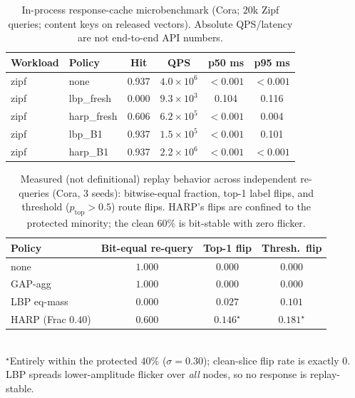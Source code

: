 \documentclass[conference]{IEEEtran}
\begin{document}
\begin{table}[!t]
\caption{In-process response-cache microbenchmark (Cora; $20$k Zipf queries; content keys on released vectors). Absolute QPS/latency are not end-to-end API numbers.}
\label{tab:serving}
\centering
\scriptsize
\begin{tabular}{@{}llcccc@{}}
\toprule
\textbf{Workload} & \textbf{Policy} & \textbf{Hit} & \textbf{QPS} & \textbf{p50 ms} & \textbf{p95 ms} \\
\midrule
zipf & none & 0.937 & $4.0{\times}10^6$ & ${<}0.001$ & ${<}0.001$ \\
zipf & lbp\_fresh & 0.000 & $9.3{\times}10^3$ & 0.104 & 0.116 \\
zipf & harp\_fresh & 0.606 & $6.2{\times}10^5$ & ${<}0.001$ & 0.004 \\
zipf & lbp\_B1 & 0.937 & $1.5{\times}10^5$ & ${<}0.001$ & 0.101 \\
zipf & harp\_B1 & 0.937 & $2.2{\times}10^6$ & ${<}0.001$ & ${<}0.001$ \\
\bottomrule
\end{tabular}
\end{table}

\begin{table}[!t]
\caption{Measured (not definitional) replay behavior across independent re-queries (Cora, 3 seeds): bitwise-equal fraction, top-1 label flips, and threshold ($p_{\mathrm{top}}{>}0.5$) route flips. HARP's flips are confined to the protected minority; the clean $60\%$ is bit-stable with zero flicker.}
\label{tab:cache}
\centering
\scriptsize
\begin{tabular}{@{}lccc@{}}
\toprule
\textbf{Policy} & \textbf{Bit-equal re-query} & \textbf{Top-1 flip} & \textbf{Thresh.\ flip} \\
\midrule
none & $1.000$ & $0.000$ & $0.000$ \\
GAP-agg & $1.000$ & $0.000$ & $0.000$ \\
LBP eq-mass & $0.000$ & $0.027$ & $0.101$ \\
HARP (Frac $0.40$) & $0.600$ & $0.146^\star$ & $0.181^\star$ \\
\bottomrule
\end{tabular}\\[2pt]
{\footnotesize $^\star$Entirely within the protected $40\%$ ($\sigma{=}0.30$); clean-slice flip rate is exactly $0$. LBP spreads lower-amplitude flicker over \emph{all} nodes, so no response is replay-stable.}
\end{table}
\end{document}
